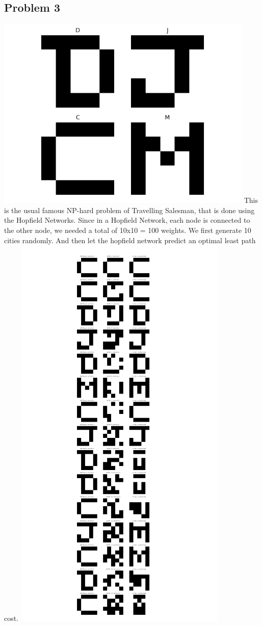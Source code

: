 \documentclass[conference]{IEEEtran}
\begin{document}
\subsection{Problem 3}
\includegraphics{Screenshot 2023-02-25 143219.png}
This is the usual famous NP-hard problem of Travelling
Salesman, that is done using the Hopfield Networks.
Since in a Hopfield Network, each node is connected to
the other node, we needed a total of 10x10 = 100 weights.
We first generate 10 cities randomly. And then let the hopfield network predict an optimal least
path cost.
\includegraphics{Screenshot 2023-02-25 143543.png}
\end{document}
